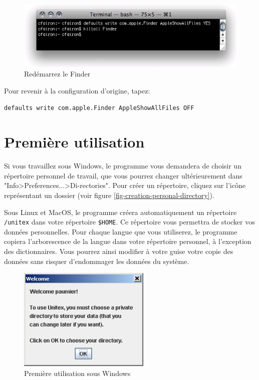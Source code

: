 \begin{figure}[!h]
\begin{center}
\includegraphics[width=12cm]{resources/img/fig-mac6.png}
\caption{Redémarrez le Finder\label{fig-mac6}}
\end{center}
\end{figure}

\bigskip
\noindent Pour revenir à la configuration d'origine, tapez: 

\bigskip
\verb+defaults write com.apple.Finder AppleShowAllFiles OFF+


\section{Première utilisation}
Si vous travaillez sous Windows, le programme vous demandera de choisir un répertoire personnel
 de travail, que vous pourrez changer ultérieurement dans
"Info>Preferences...>Di-rectories". Pour créer un répertoire, cliquez sur l’icône représentant un
dossier (voir figure \ref{fig-creation-personal-directory}).

\bigskip
\noindent Sous Linux et MacOS, le programme créera automatiquement un répertoire
\verb+/unitex+ dans votre répertoire \verb+$HOME+. Ce répertoire vous permettra de stocker vos
données personnelles. 
Pour chaque langue que vous utiliserez, le programme copiera l’arborescence de la langue dans votre
répertoire personnel,
à l’exception des dictionnaires. Vous pourrez ainsi modifier à votre guise votre copie des données
sans risquer d’endommager les données du système.



\begin{figure}[h]
\begin{center}
\includegraphics[width=6.3cm]{resources/img/fig1-1.png}
\caption{Première utilisation sous Windows}
\end{center}
\end{figure}

